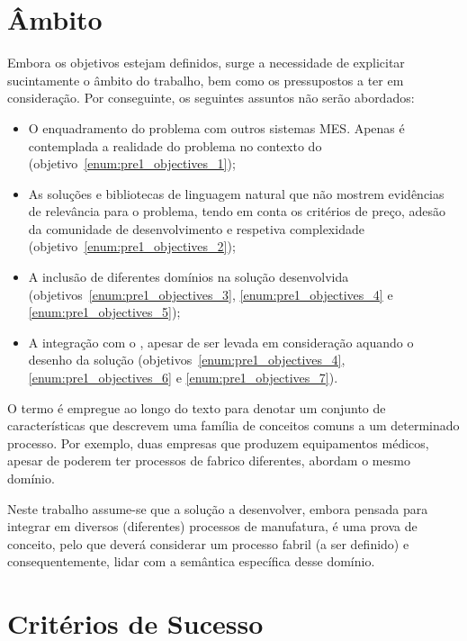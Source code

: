 \section{Âmbito}

Embora os objetivos estejam definidos, surge a necessidade de explicitar sucintamente o âmbito do trabalho, bem como os pressupostos a ter em consideração. Por conseguinte, os seguintes assuntos não serão abordados:

\begin{itemize}
    \item
    {
        O enquadramento do problema com outros sistemas \gls{MES}. Apenas é contemplada a realidade do problema no contexto do {\productname} (objetivo~\ref{enum:pre1_objectives_1});
    }
    \item
    {
        As soluções e bibliotecas de linguagem natural que não mostrem evidências de relevância para o problema, tendo em conta os critérios de preço, adesão da comunidade de desenvolvimento e respetiva complexidade (objetivo~\ref{enum:pre1_objectives_2});
    }
    \item 
    {
        A inclusão de diferentes domínios na solução desenvolvida (objetivos~\ref{enum:pre1_objectives_3}, \ref{enum:pre1_objectives_4} e \ref{enum:pre1_objectives_5});
    }
    \item 
    {
        A integração com o {\productname}, apesar de ser levada em consideração aquando o desenho da solução (objetivos~\ref{enum:pre1_objectives_4}, \ref{enum:pre1_objectives_6} e \ref{enum:pre1_objectives_7}).
    }
\end{itemize}

O termo  é empregue ao longo do texto para denotar um conjunto de características que descrevem uma família de conceitos comuns a um determinado processo. Por exemplo, duas empresas que produzem equipamentos médicos, apesar de poderem ter processos de fabrico diferentes, abordam o mesmo domínio.

Neste trabalho assume-se que a solução a desenvolver, embora pensada para integrar em diversos (diferentes) processos de manufatura, é uma prova de conceito, pelo que deverá considerar um processo fabril (a ser definido) e consequentemente, lidar com a semântica específica desse domínio.

\section{Critérios de Sucesso}
\label{sec:pre1_success_criteria}

